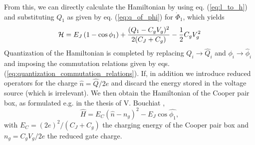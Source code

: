 %
From this, we can directly calculate the Hamiltonian by using eq. (\ref{eq:l_to_h}) and substituting $Q_1$ as given by eq. (\ref{eq:q_of_phi}) for $\dot{\Phi}_1$, which yields
%
\begin{equation}
\begin{mathcal}H\end{mathcal} = E_J\left(1-\cos{\phi_1}\right)+\frac{(Q_1-C_g V_g)^2}{2(C_J+C_g)}-\frac{1}{2}C_g V_g^2
\end{equation}
%
Quantization of the Hamiltonian is completed by replacing $Q_i\to \hat{Q}_i$ and $\phi_i\to\hat{\phi}_i$ and imposing the commutation relations given by eqs. (\ref{eq:quantization_commutation_relations}). If, in addition we introduce reduced operators for the charge $\hat{n}=\hat{Q}/2e$ and discard the energy stored in the voltage source (which is irrelevant). We then obtain the Hamiltonian of the Cooper pair box, as formulated e.g. in the thesis of V. Bouchiat \citep{bouchiat_quantum_1998},
%
\begin{equation}
\hat{H} = E_C \left( \hat{n} - n_g\right)^2-E_J \cos{\hat{\phi_1}}, \label{eq:cpb_hamiltonian}
\end{equation}
%
with $E_C = (2e)^2 / (C_J+C_g)$ the charging energy of the Cooper pair box and $n_g=C_g V_g /2e $ the reduced gate charge.

\smallskip

